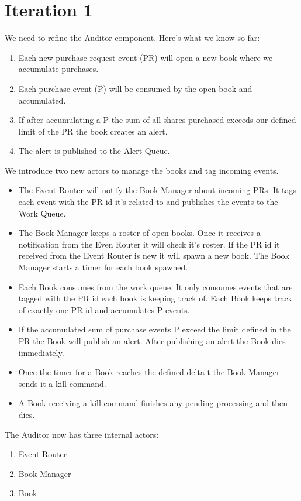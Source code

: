\documentclass[captions=tableheading]{scrreprt}
\begin{document}
\section{Iteration 1}
\label{sec:orgheadline14}
We need to refine the Auditor component. Here's what we know so far:
\begin{enumerate}
\item Each new purchase request event (PR) will open a new book where we
accumulate purchases.
\item Each purchase event (P) will be consumed by the open book and
accumulated.
\item If after accumulating a P the sum of all shares purchased exceeds
our defined limit of the PR the book creates an alert.
\item The alert is published to the Alert Queue.
\end{enumerate}

We introduce two new actors to manage the books and tag incoming
events.

\begin{itemize}
\item The Event Router will notify the Book Manager about incoming PRs. It
tags each event with the PR id it's related to and publishes the
events to the Work Queue.
\item The Book Manager keeps a roster of open books. Once it receives a
notification from the Even Router it will check it's roster. If the
PR id it received from the Event Router is new it will spawn a new
book. The Book Manager starts a timer for each book spawned.
\item Each Book consumes from the work queue.
It only consumes events that are tagged with the PR id each book is
keeping track of. Each Book keeps track of exactly one PR id and
accumulates P events.
\item If the accumulated sum of purchase events P exceed the limit defined
in the PR the Book will publish an alert. After publishing an alert
the Book dies immediately.
\item Once the timer for a Book reaches the defined delta t the Book
Manager sends it a kill command.
\item A Book receiving a kill command finishes any pending processing and then
dies.
\end{itemize}

The Auditor now has three internal actors:
\begin{enumerate}
\item Event Router
\item Book Manager
\item Book
\end{enumerate}
\end{document}
